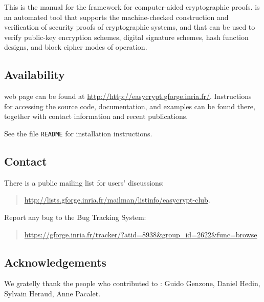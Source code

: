 This is the manual for the \EasyCrypt framework for computer-aided
cryptographic proofs. \EasyCrypt is an automated tool that supports
the machine-checked construction and verification of security proofs
of cryptographic systems, and that can be used to verify public-key
encryption schemes, digital signature schemes, hash function designs,
and block cipher modes of operation.


\subsection*{Availability}

\EasyCrypt web page can be found at
\url{http://http://easycrypt.gforge.inria.fr/}. Instructions for
accessing the source code, documentation, and examples can be found
there, together with contact information and recent publications.

See the file \texttt{README} for installation instructions.


\subsection*{Contact}

There is a public mailing list for users' discussions: 
\begin{quote}
\url{http://lists.gforge.inria.fr/mailman/listinfo/easycrypt-club}.
\end{quote}

\noindent
Report any bug to the \EasyCrypt Bug Tracking System:
\begin{quote}
\url{https://gforge.inria.fr/tracker/?atid=8938&group_id=2622&func=browse}
\end{quote}

\subsection*{Acknowledgements}

We gratelly thank the people who contributed to \EasyCrypt: 
Guido Genzone, 
Daniel Hedin, 
Sylvain Heraud, 
Anne Pacalet.



